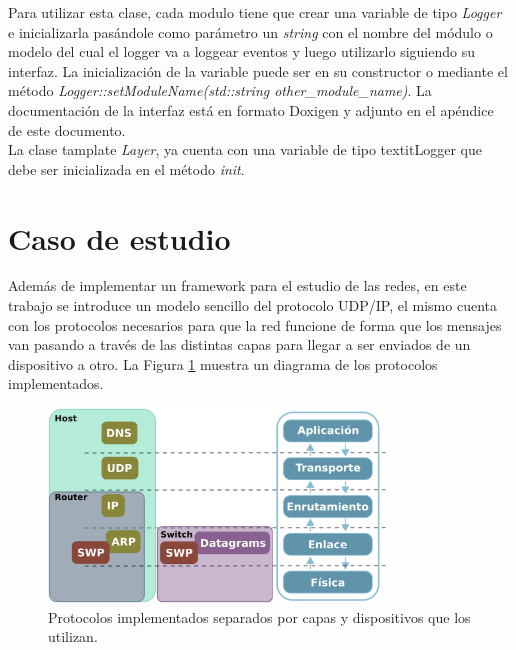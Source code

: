 \documentclass[10pt,a4paper]{article}
\begin{document}
Para utilizar esta clase, cada modulo tiene que crear una variable de tipo \textit{Logger} e inicializarla pasándole como parámetro un \textit{string} con el nombre del módulo o modelo del cual el logger va a loggear eventos y luego utilizarlo siguiendo su interfaz. La inicialización de la variable puede ser en su constructor o mediante el método \textit{Logger::setModuleName(std::string other\_module\_name)}. La documentación de la interfaz está en formato Doxigen y adjunto en el apéndice de este documento. \\

La clase tamplate \textit{Layer}, ya cuenta con una variable de tipo textit{Logger} que debe ser inicializada en el método \textit{init}.

\section{Caso de estudio}
	Además de implementar un framework para el estudio de las redes, en este trabajo se introduce un modelo sencillo del protocolo UDP/IP, el mismo cuenta con los protocolos necesarios para que la red funcione de forma que los mensajes van pasando a través de las distintas capas para llegar a ser enviados de un dispositivo a otro. La Figura \ref{figure: protocolos} muestra un diagrama de los protocolos implementados. \\

\begin{figure}[!htb]
    \centering
    \includegraphics[width = 0.8\textwidth]{img/png/protocols.png}
    \caption{Protocolos implementados separados por capas y dispositivos que los utilizan.}
    \label{figure: protocolos}
\end{figure}
	
\end{document}
